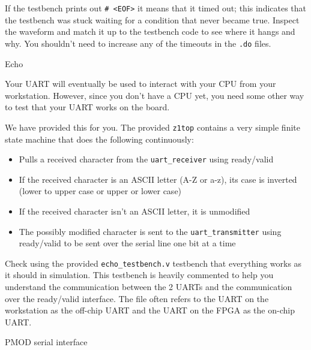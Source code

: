 \documentclass[11pt]{article}
\makeatletter
\renewcommand{\section}
{\@startsection {section}{1}{0pt}
 {-2ex}
 {1ex}
 {\bfseries\Large}}
\renewcommand{\subsection}
{\@startsection {subsection}{1}{0pt}
 {-1ex}
 {0.5ex}
 {\bfseries\normalsize}}
\makeatother
\begin{document}
If the testbench prints out \verb|# <EOF>| it means that it timed out; this indicates that the testbench was stuck waiting for a condition that never became true. Inspect the waveform and match it up to the testbench code to see where it hangs and why. You shouldn't need to increase any of the timeouts in the \verb|.do| files.

\section{Echo}

Your UART will eventually be used to interact with your CPU from your workstation. However, since you don't have a CPU yet, you need some other way to test that your UART works on the board.

We have provided this for you. The provided \verb|z1top| contains a very simple finite state machine that does the following continuously:

\begin{itemize}
  \item Pulls a received character from the \verb|uart_receiver| using ready/valid
  \item If the received character is an ASCII letter (A-Z or a-z), its case is inverted (lower to upper case or upper or lower case)
  \item If the received character isn't an ASCII letter, it is unmodified
  \item The possibly modified character is sent to the \verb|uart_transmitter| using ready/valid to be sent over the serial line one bit at a time
\end{itemize}

Check using the provided \verb|echo_testbench.v| testbench that everything works as it should in simulation. This testbench is heavily commented to help you understand the communication between the 2 UARTs and the communication over the ready/valid interface. The file often refers to the UART on the workstation as the off-chip UART and the UART on the FPGA as the on-chip UART.

\subsection{PMOD serial interface}
\end{document}
